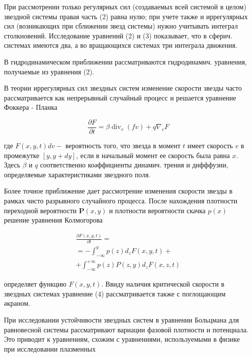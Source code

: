 \documentclass[10pt]{article}
\begin{document}
При рассмотрении только регулярных сил (создаваемых всей системой в целом) звездной системы правая часть (2) равна нулю; при учете также и иррегулярных сил (возникающих при сближении звезд системы) нужно учитывать интеграл столкновений. Исследование уравнений (2) и (3) показывает, что в сферич. системах имеются два, а во вращающихся системах три интеграла движения.



В гидродинамическом приближении рассматриваются гидродинамич. уравнения, получаемые из уравнения (2).



В теории иррегулярных сил звездных систем изменение скорости звезды часто рассматривается как непрерывный случайный процесс и решается уравнение Фоккера - Планка



\[

\frac{\partial F}{\partial t}=\beta \operatorname{div}_{v}(f v)+q \nabla_{v} F

\]



где $F(x, y, t) d v-$ вероятность того, что звезда в момент $t$ имеет скорость $v$ в промежутке $[y, y+d y]$, если в начальный момент ее скорость была равна $x$. Здесь $\beta$ и $q$ соответственно коәффициенты динамич. трения и дифффузии, определяемые характеристиками звездного поля.



Более точное приближение дает рассмотрение изменения скорости звезды в рамках чисто разрывного случайного процесса. После нахождения плотности переходной вероятности $\boldsymbol{P}(x, y)$ и плотности вероятности скачка $p(x)$ решение уравнения Колмогорова



\[

\begin{gathered}

\frac{\partial F(x, y, t)}{\partial t}= \\

=-\int_{-\infty}^{y} p(z) d_{z} F(x, y, t)+ \\

+\int_{-\infty}^{+\infty} p(z) P(z, y) d_{z} F(x, z, t)

\end{gathered}

\]



определяет функцию $F(x, y, t)$. Ввиду наличия критической скорости в звездных системах уравнение (4) рассматривается также с поглощающим әкраном.



При исследовании устойчивости звездных систем в уравнении Больцмана для равновесной системы рассматривают вариации фазовой плотности и потенциала. Это приводит к уравнениям, схожим с уравнениями, используемыми в физике при исследовании плазменных
\end{document}
